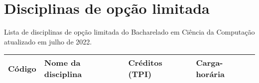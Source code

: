 \section{Disciplinas de opção limitada}

Lista de disciplinas de opção limitada do Bacharelado em Ciência da Computação
atualizado em julho de 2022.

\begin{longtable}{|p{}|p{}|p{}|p{}|}
    \hline
    Código & Nome da disciplina & Créditos (TPI) & Carga-horária\\
    \hline\hline
\end{longtable}
